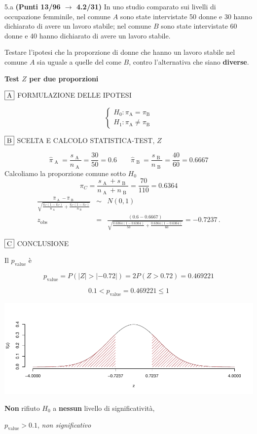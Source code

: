 \documentclass[
  11pt,
]{book}
\theoremstyle{mytheoremstyle}
\theoremstyle{mydefstyle}
\newenvironment{sol}
  {
  \begin{tcolorbox}[enhanced,breakable,arc=0.1mm,boxrule=1pt,colback=white,colframe=iblue,
  title=\bf \fontfamily{lmss}\selectfont \hspace{.5 cm} Soluzione,drop fuzzy shadow]

}{
\end{tcolorbox}
  }
\begin{document}
5.a \textbf{(Punti 13/96 \(\rightarrow\) 4.2/31)} In uno studio comparato sui livelli di occupazione femminile, nel comune \(A\) sono state intervistate 50 donne e 30 hanno dichiarato di avere un lavoro stabile; nel comune \(B\) sono state intervistate 60 donne e 40 hanno dichiarato di avere un lavoro stabile.

Testare l'ipotesi che la proporzione di donne che hanno un lavoro stabile nel comune \(A\) sia uguale a quelle del come \(B\), contro l'alternativa che siano \textbf{diverse}.

\begin{sol}
\textbf{Test \(Z\) per due proporzioni}

\(\fbox{A}\) FORMULAZIONE DELLE IPOTESI

\[\begin{cases}
   H_0: \pi_\text{A} = \pi_\text{B} \\
   H_1: \pi_\text{A} \neq \pi_\text{B} 
   \end{cases}\]

\(\fbox{B}\) SCELTA E CALCOLO STATISTICA-TEST, \(Z\)

\[\hat\pi_\text{ A }=\frac{s_\text{ A }}{n_\text{ A }}=\frac{ 30 }{ 50 }= 0.6 \qquad
   \hat\pi_\text{ B }=\frac{s_\text{ B }}{n_\text{ B }}=\frac{ 40 }{ 60 }= 0.6667 \]Calcoliamo la proporzione comune sotto \(H_0\)
\[
     \pi_C=\frac{s_\text{ A }+s_\text{ B }}{n_\text{ A }+n_\text{ B }}=
     \frac{ 70 }{ 110 }= 0.6364 
   \]\begin{eqnarray*}
   \frac{\hat\pi_\text{ A } - \hat\pi_\text{ B }}
   {\sqrt{\frac {\pi_C(1-\pi_C)}{n_\text{ A }}+\frac {\pi_C(1-\pi_C)}{n_\text{ B }}}}&\sim&N(0,1)\\
   z_{\text{obs}}
   &=& \frac{ ( 0.6 -  0.6667 )} {\sqrt{\frac{ 0.6364 (1- 0.6364 )}{ 50 }+\frac{ 0.6364 (1- 0.6364 )}{ 60 }}}
   =   -0.7237 \, .
   \end{eqnarray*}

\(\fbox{C}\) CONCLUSIONE

Il \(p_{\text{value}}\) è

\[ p_{\text{value}} = P(|Z|>|-0.72|)=2P(Z>0.72)=0.469221 \]

\[
 0.1 < p_\text{value}= 0.469221 \leq 1 
\]

\begin{center}\includegraphics{Esami_passati_con_soluzioni_files/figure-latex/2021-4,-1} \end{center}

\textbf{Non} rifiuto \(H_0\) a \textbf{nessun}
livello di significatività,

\(p_\text{value}>0.1\),
\emph{non significativo}

\end{sol}
\end{document}
